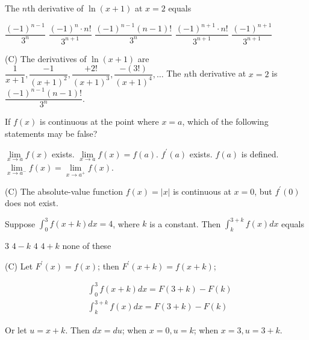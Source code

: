 \newpage





\question
The $n$th derivative of $\ln (x+1)$ at $x=2$ equals
\begin{choices}
  \choice $\dfrac{(-1)^{n-1}}{3^{n}}$
  \choice $\dfrac{(-1)^{n} \cdot n!}{3^{n+1}}$
  \CorrectChoice $\dfrac{(-1)^{n-1}(n-1)!}{3^{n}}$
  \choice $\dfrac{(-1)^{n+1} \cdot n!}{3^{n+1}}$
  \choice $\dfrac{(-1)^{n+1}}{3^{n+1}}$
\end{choices}
\begin{solution}
(C) The derivatives of $\ln (x+1)$ are $\dfrac{1}{x+1}, \dfrac{-1}{(x+1)^{2}}, \dfrac{+2!}{(x+1)^{3}}, \dfrac{-(3!)}{(x+1)^{4}}, \ldots$ The $n$th derivative at $x=2$ is $\dfrac{(-1)^{n-1}(n-1)!}{3^{n}}$.
\end{solution}

\question
If $f(x)$ is continuous at the point where $x=a$, which of the following statements may be false?
\begin{choices}
  \choice $\lim\limits_{x \to a} f(x)$ exists.
  \choice $\lim\limits_{x \to a} f(x)=f(a)$.
  \CorrectChoice $f^{\prime}(a)$ exists.
  \choice $f(a)$ is defined.
  \choice $\lim\limits_{x \to a^{-}} f(x)=\lim\limits_{x \to a^{+}} f(x)$.
\end{choices}
\begin{solution}
(C) The absolute-value function $f(x)=|x|$ is continuous at $x=0$, but $f^{\prime}(0)$ does not exist.
\end{solution}

\question
Suppose $\displaystyle\int_{0}^{3} f(x+k) d x=4$, where $k$ is a constant. Then $\displaystyle\int_{k}^{3+k} f(x) d x$ equals
\begin{choices}
  \choice $3$
  \choice $4-k$
  \CorrectChoice $4$
  \choice $4+k$
  \choice none of these
\end{choices}
\begin{solution}
(C) Let $F^{\prime}(x)=f(x)$; then $F^{\prime}(x+k)=f(x+k)$;

\[
\begin{aligned}
& \displaystyle\int_{0}^{3} f(x+k) d x=F(3+k)-F(k) \\
& \displaystyle\int_{k}^{3+k} f(x) d x=F(3+k)-F(k)
\end{aligned}
\]

Or let $u=x+k$. Then $d x=d u$; when $x=0, u=k$; when $x=3, u=3+k$.
\end{solution}

